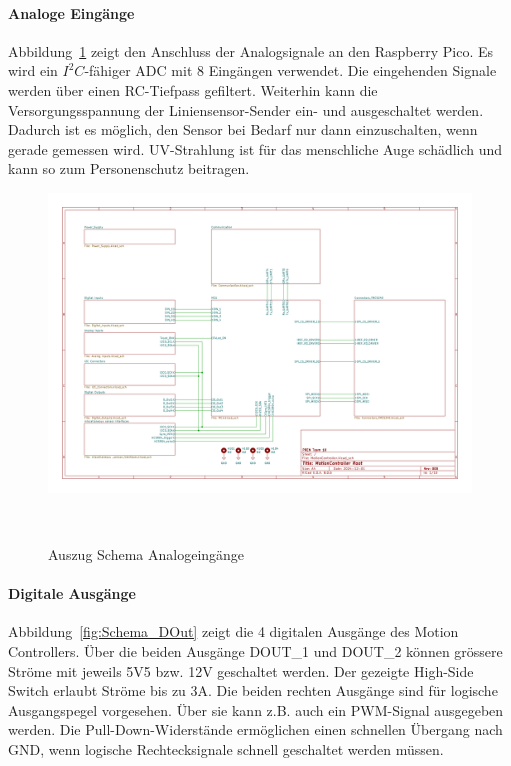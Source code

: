 \documentclass[main.  tex]{subfiles} %
\begin{document}
\paragraph{Analoge Eingänge}
Abbildung~\ref{fig:Schema_AIn} zeigt den Anschluss der Analogsignale an den
Raspberry Pico. Es wird ein $I^2C$-fähiger ADC mit 8 Eingängen verwendet. Die
eingehenden Signale werden über einen RC-Tiefpass gefiltert. Weiterhin kann die
Versorgungsspannung der Liniensensor-Sender ein- und ausgeschaltet werden.
Dadurch ist es möglich, den Sensor bei Bedarf nur dann einzuschalten, wenn
gerade gemessen wird. UV-Strahlung ist für das menschliche Auge schädlich und
kann so zum Personenschutz beitragen.

\begin{figure}[h!]
    \centering
    \includegraphics[page=7,width=\textwidth]{../Anhang_pdfs/MotionController.pdf}
    \caption{Auszug Schema Analogeingänge}~\label{fig:Schema_AIn}
\end{figure}

\paragraph{Digitale Ausgänge}
Abbildung~\ref{fig:Schema_DOut} zeigt die 4 digitalen Ausgänge des Motion
Controllers. Über die beiden Ausgänge DOUT\_1 und DOUT\_2 können grössere
Ströme mit jeweils 5V5 bzw. 12V geschaltet werden. Der gezeigte High-Side
Switch erlaubt Ströme bis zu 3A. Die beiden rechten Ausgänge sind für logische
Ausgangspegel vorgesehen. Über sie kann z.B. auch ein PWM-Signal ausgegeben
werden. Die Pull-Down-Widerstände ermöglichen einen schnellen Übergang nach
GND, wenn logische Rechtecksignale schnell geschaltet werden müssen.
\end{document}
